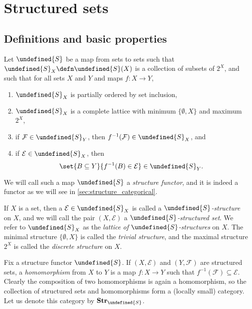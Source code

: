 \documentclass[article, a4paper, 11pt, oneside]{memoir}
\let\mathfrak\undefined
\numberwithin{equation}{chapter}
\newcommand{\calE}{\mathcal{E}}
\newcommand{\calF}{\mathcal{F}}
\newcommand{\strucS}{\mathfrak{S}}
\newcommand{\powerset}[1]{2^{#1}}
\newcommand{\ncat}[1]{\mathbf{#1}} %
\newcommand{\catStruc}[1]{\ncat{Str}_{#1}} %
\newcommand{\catStrucS}{\catStruc{\strucS}} %
\begin{document}
\chapter{Structured sets}


\section{Definitions and basic properties}

Let $\strucS$ be a map from sets to sets such that $\strucS_X \defn \strucS(X)$ is a collection of subsets of $\powerset{X}$, and such that for all sets $X$ and $Y$ and maps $f \colon X \to Y$,
%
\begin{enumerate}
    \item $\strucS_X$ is partially ordered by set inclusion,
    
    \item $\strucS_X$ is a complete lattice with minimum $\{\emptyset, X\}$ and maximum $2^X$,
    
    \item\label{enum:structure_def_pullback} if $\calF \in \strucS_Y$, then $f^{-1}(\calF) \in \strucS_X$, and
    
    \item\label{enum:structure_def_pushforward} if $\calE \in \strucS_X$, then
    \begin{equation*}
        \set{B \subseteq Y}{f^{-1}(B) \in \calE} \in \strucS_Y.
    \end{equation*}
\end{enumerate}
%
We will call such a map $\strucS$ a \emph{structure functor}, and it is indeed a functor as we will see in \cref{sec:structure_categorical}.

If $X$ is a set, then a $\calE \in \strucS_X$ is called a \emph{$\strucS$-structure} on $X$, and we will call the pair $(X, \calE)$ a \emph{$\strucS$-structured set}. We refer to $\strucS_X$ as the \emph{lattice of $\strucS$-structures} on $X$. The minimal structure $\{\emptyset, X\}$ is called the \emph{trivial structure}, and the maximal structure $\powerset{X}$ is called the \emph{discrete structure} on $X$.

Fix a structure functor $\strucS$. If $(X, \calE)$ and $(Y, \calF)$ are structured sets, a \emph{homomorphism} from $X$ to $Y$ is a map $f \colon X \to Y$ such that $f^{-1}(\calF) \subseteq \calE$. Clearly the composition of two homomorphisms is again a homomorphism, so the collection of structured sets and homomorphisms form a (locally small) category. Let us denote this category by $\catStrucS$.
\end{document}
